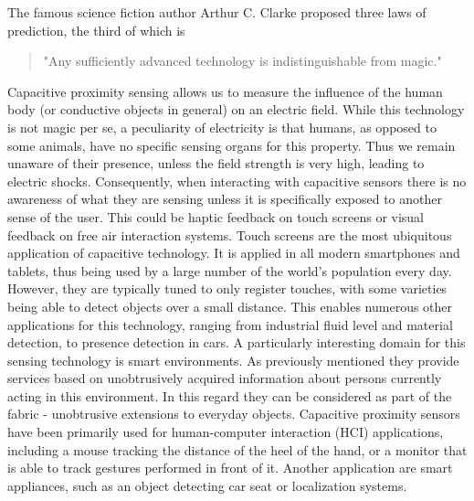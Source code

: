 The famous science fiction author Arthur C. Clarke proposed three laws of prediction, the third of which is 
\begin{quote}
"Any sufficiently advanced technology is indistinguishable from magic." \cite{clarke1962hazards} 
\end{quote}
Capacitive proximity sensing allows us to measure the influence of the human body (or conductive objects in general) on an electric field. While this technology is not magic per se, a peculiarity of electricity is that humans, as opposed to some animals, have no specific sensing organs for this property. Thus we remain unaware of their presence, unless the field strength is very high, leading to electric shocks. Consequently, when interacting with capacitive sensors there is no awareness of what they are sensing unless it is specifically exposed to another sense of the user. This could be haptic feedback on touch screens or visual feedback on free air interaction systems. Touch screens are the most ubiquitous application of capacitive technology. It is applied in all modern smartphones and tablets, thus being used by a large number of the world's population every day. However, they are typically tuned to only register touches, with some varieties being able to detect objects over a small distance. This enables numerous other applications for this technology, ranging from industrial fluid level and material detection, to presence detection in cars. A particularly interesting domain for this sensing technology is smart environments. As previously mentioned they provide services based on unobtrusively acquired information about persons currently acting in this environment. In this regard they can be considered as part of the fabric - unobtrusive extensions to everyday objects. Capacitive proximity sensors have been primarily used for human-computer interaction (HCI) applications, including a mouse tracking the distance of the heel of the hand, or a monitor that is able to track gestures performed in front of it. Another application are smart appliances, such as an object detecting car seat or localization systems. 

